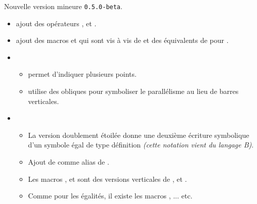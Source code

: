 Nouvelle version mineure \verb+0.5.0-beta+.

\begin{itemize}[itemsep=.5em]
    \item {}
          ajout des opérateurs ,  et .




    \item {}
           ajout des macros  et  qui sont vis à vis de  et  des équivalents de  pour .




    \item {}
    \begin{itemize}[itemsep=.5em]
        \item {} permet d'indiquer plusieurs points.

        \item {} utilise des obliques pour symboliser le parallélisme au lieu de barres verticales.
    \end{itemize}




    \item {}
    \begin{itemize}[itemsep=.5em]
        \item La version doublement étoilée  donne une deuxième écriture symbolique d'un symbole égal de type définition \emph{(cette notation vient du langage B)}.

        \item Ajout de  comme alias de .

        \item Les macros ,  et  sont des versions verticales de ,  et .

        \item Comme pour les égalités, il existe les macros ,  ... etc.
    \end{itemize}
\end{itemize}

